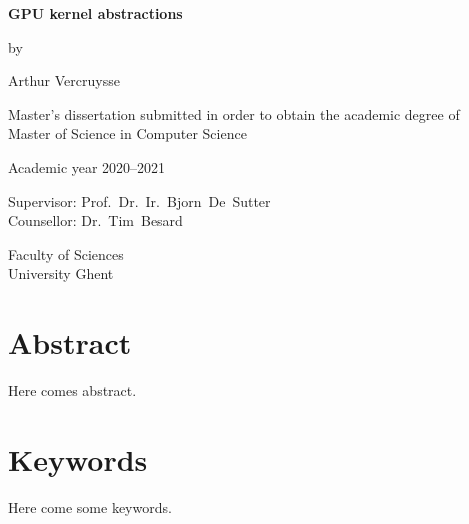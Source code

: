 \newpage

{
\setlength{\baselineskip}{14pt}
\setlength{\parindent}{0pt}
\setlength{\parskip}{8pt}

\begin{center}

\noindent \textbf{\huge
GPU kernel abstractions
}

by

Arthur Vercruysse

Master's dissertation submitted in order to obtain the academic degree of\\
Master of Science in Computer Science

Academic year 2020--2021

Supervisor: Prof.~Dr.~Ir.~Bjorn~De~Sutter\\
Counsellor: Dr.~Tim~Besard

Faculty of Sciences\\
University Ghent

\end{center}

\section*{Abstract}


Here comes abstract.


\section*{Keywords}


Here come some keywords.

}

\newpage
